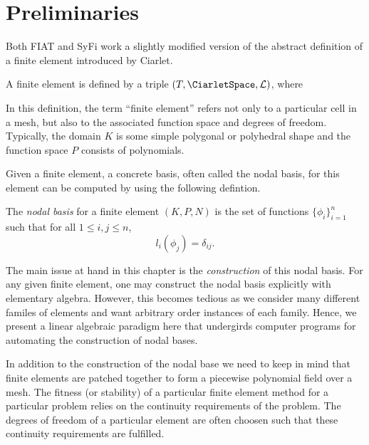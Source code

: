 \section{Preliminaries}
Both FIAT and SyFi work a slightly modified version of the  abstract definition of a finite element introduced by
Ciarlet.
\begin{definition}
  A finite element is defined by a triple
  $(T, \CiarletSpace,\mathcal{L})$, where
  \femdefinition{}
  \label{chap:kirby-1:fedef} 
\end{definition}


In this definition, the term ``finite element'' refers not only to
a particular cell in a  mesh, but also to the associated function
space and degrees of freedom.  Typically, the domain \( K \) is some
simple polygonal or polyhedral shape and the function space \( P \)
consists of polynomials.

Given a finite element, a concrete
basis, often called the nodal basis,
for this element can be computed by using the following defintion.



\begin{definition}
The \emph{nodal basis} for a finite element \( (K,P,N) \) 
is the set of functions \( \{ \phi_i \}_{i=1}^{n} \) such
that for all \( 1 \leq i,j \leq n \),
\begin{equation}
l_i(\phi_j) = \delta_{ij}.
\end{equation}
\label{chap:kirby-1:nodaldef}
\end{definition}

The main issue at hand in this chapter is the \emph{construction} of
this nodal basis.  For
any given finite element, one may construct the nodal basis
explicitly with elementary algebra.  However, this becomes tedious as
we consider many different familes of elements and want arbitrary
order instances of each family.  Hence, we present a linear algebraic
paradigm here that undergirds computer programs for automating the
construction of nodal bases.

In addition to the construction of the nodal base we need to keep in mind that
finite elements are patched together to form a piecewise
polynomial field over a mesh. The fitness (or stability) of a particular finite element method for a particular problem relies on the continuity
requirements of the problem. The degrees of freedom of a particular element
are often choosen such that these continuity requirements are fulfilled.

